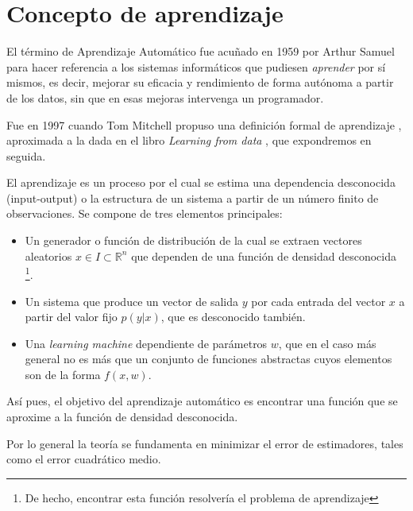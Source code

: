%

\section{Concepto de aprendizaje}\label{sec:Aprendizaje}

El término de Aprendizaje Automático 
\cite{hisour} 
fue acuñado en 1959 por Arthur Samuel 
para hacer referencia a los sistemas informáticos que 
pudiesen \textit{aprender} por sí mismos, es decir, mejorar su 
eficacia y rendimiento de forma autónoma a partir de los datos, 
sin que en esas mejoras intervenga un programador.

Fue en 1997 cuando Tom Mitchell propuso una definición 
formal de aprendizaje 
\cite{tom-michell-machine-learning}, 
aproximada a la dada en el libro \textit{Learning from data}
\cite{learning-from-data-1-2}, que expondremos en seguida.

El aprendizaje es un proceso por el cual se estima una dependencia desconocida 
(input-output) o la estructura de un sistema a partir de un número finito de 
observaciones. Se compone de tres elementos principales: 

\begin{itemize}
    \item Un generador o función de distribución de la cual se extraen 
    vectores aleatorios 
    $x \in I \subset \mathbb R^ n$ 
    que dependen de una función de densidad desconocida \footnote{De hecho, encontrar esta función resolvería el problema de aprendizaje}.
    
    \item Un sistema que produce un vector de salida $y$ por cada entrada del vector $x$ a partir del valor fijo $p(y|x)$, que es desconocido también. 
    
    \item Una \textit{learning machine} dependiente de parámetros $w$, que en el caso más general no es  más que un conjunto de funciones abstractas cuyos elementos son de la forma $f(x,w)$.
\end{itemize}



Así pues, el objetivo del aprendizaje automático es encontrar una función que se aproxime a la función de densidad desconocida.

Por lo general la teoría se fundamenta en minimizar el error de estimadores, 
tales como el error cuadrático medio.

